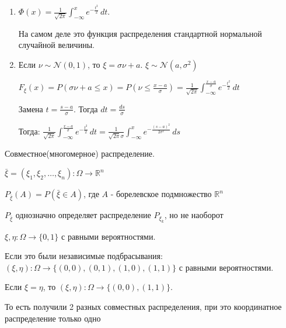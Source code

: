 \begin{example}
    \begin{remark}
        \begin{enumerate}
            \item {
                $\Phi (x) = \frac{1}{\sqrt{2 \pi}} \int_{-\infty}^{x} e^{-\frac{t^2}{2}} \, dt$.

                На самом деле это функция распределения стандартной нормальной случайной величины.
            }
            \item {
                Если $\nu \sim \mathcal{N}(0, 1)$, то $\xi = \sigma \nu + a$. $\xi \sim \mathcal{N}(a, \sigma^2)$

                $F_{\xi} (x) = P(\sigma \nu + a \leqslant x) = P(\nu \leqslant \frac{x - a}{\sigma}) = \frac{1}{\sqrt{2 \pi}} 
                \int_{-\infty}^{\frac{x - a}{\sigma}} e^{-\frac{t^2}{2}} \, dt$

                Замена $t = \frac{s - a}{\sigma}$. Тогда $dt = \frac{ds}{\sigma}$

                Тогда: $\frac{1}{\sqrt{2 \pi}} 
                \int_{-\infty}^{\frac{x - a}{\sigma}} e^{-\frac{t^2}{2}} \, dt = \frac{1}{\sqrt{2\pi} \sigma}
                \int_{-\infty}^{x} e^{-\frac{(s - a)^2}{2\sigma^2}} \, ds$
            }
        \end{enumerate}
    
    \end{remark}
\end{example}


\begin{definition}
    Совместное(многомерное) распределение.

    $\bar{\xi} = (\xi_1, \xi_2, \ldots, \xi_n) : \Omega \to \mathbb{R}^n$

    $P_{\bar{\xi}} (A) = P(\bar{\xi} \in A)$, где $A$ - борелевское подмножество $\mathbb{R}^n$ 

    \begin{remark}
        $P_{\bar{\xi}}$ однозначно определяет распределение $P_{\xi_k}$, но не наоборот

        \begin{example}
            $\xi, \eta : \Omega \to \{ 0, 1 \}$  с равными вероятностями.

            Если это были независимые подбрасывания: $(\xi, \eta) : \Omega \to
            \{ (0, 0), (0, 1), (1, 0), (1, 1) \}$  с равными вероятностями.

            Если $\xi = \eta$, то $(\xi, \eta) : \Omega \to \{ (0, 0), (1, 1) \}$.

            То есть получили 2 разных совместных распределения, при это координатное распределение только одно

        \end{example}
    \end{remark}
\end{definition}

